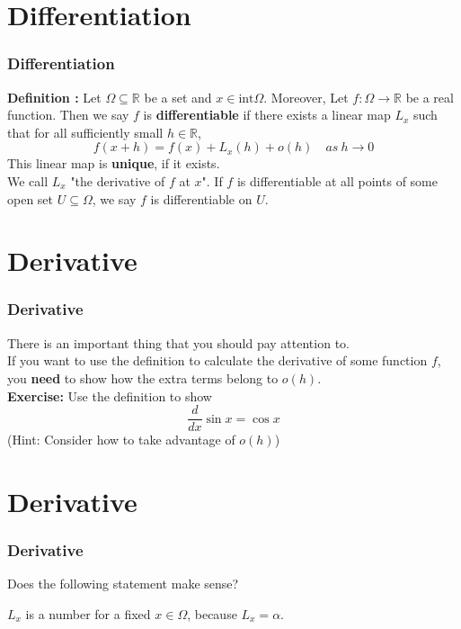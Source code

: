 \documentclass[12pt, t]{beamer}
\begin{document}
\section{Differentiation}
\begin{frame}
    \frametitle{Differentiation}

    \textbf{Definition : }
    Let $\Omega\subseteq\mathbb{R}$ be a set and $x\in \text{int}\Omega$. Moreover, Let $f:\Omega\rightarrow \mathbb{R}$ be a real function.
    Then we say $f$ is \textbf{differentiable} if there exists a linear map $L_x$ such that for all sufficiently small $h\in\mathbb{R}$,
    \begin{equation*}
        f(x+h)=f(x)+L_x(h)+o(h)\quad as\ h\rightarrow 0
    \end{equation*}
    This linear map is \textbf{unique}, if it exists. \\
    \vspace{1em}
    We call $L_x$ "the derivative of $f$ at $x$". If $f$ is differentiable at all points of some open
    set $U\subseteq \Omega$, we say $f$ is differentiable on $U$.

\end{frame}

\section{Derivative}
\begin{frame}
    \frametitle{Derivative}

    There is an important thing that you should pay attention to.\\

    \vspace{0.5em}
    \hspace{1em}
    If you want to use the definition to calculate the derivative of some function $f$, you \textbf{need} to show how the extra terms belong to
    $o(h)$.\\

    \vspace{1em}
    \textbf{Exercise:}
    \hspace{1em}
    Use the definition to show
    \begin{equation*}
        \frac{d}{dx}\sin{x}=\cos{x}
    \end{equation*}
    (Hint: Consider how to take advantage of $o(h)$)
\end{frame}

\section{Derivative}
\begin{frame}
    \frametitle{Derivative}
    Does the following statement make sense?

    \vspace{0.5em}
    \begin{center}
        $L_x$ is a number for a fixed $x\in \Omega$, because $L_x=\alpha$.
    \end{center}
    \vspace{0.5em}


\end{frame}
\end{document}
